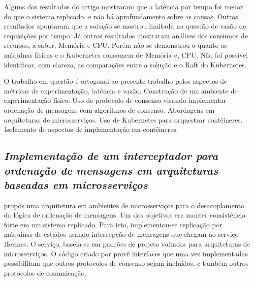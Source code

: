 
Alguns dos resultados do artigo mostraram que a latência por tempo foi menor do que o sistema replicado, e não há aprofundamento sobre as causas. Outros resultados apontaram que a solução se mostrou limitada na questão de vazão de requisições por tempo. Já outros resultados mostraram análises dos consumos de recursos, a saber, Memória e CPU. Porém não se demonstrou o quanto as máquinas físicas e o Kubernetes consomem de Memória e, CPU. Não foi possível identificar, com clareza, as comparações entre a solução e o Raft do Kubernetes.


O trabalho em questão é ortogonal ao presente trabalho pelos aspectos de métricas de experimentação, latência e vazão. Construção de um ambiente de experimentação físico. Uso de protocolo de consenso visando implementar ordenação de mensagens com algoritmos de consenso. Abordagens em arquiteturas de microsserviços. Uso de Kubernetes para orquestrar contêineres. Isolamento de aspectos de implementação em contêineres.



\pagebreak

\subsection{\textit{Implementação de um interceptador para ordenação de mensagens em arquiteturas baseadas em microsserviços}}

\textcite{renan2021hermes} propôs uma arquitetura em ambientes de microsserviços para o desacoplamento da lógica de ordenação de mensagens. Um dos objetivos era manter consistência forte em um sistema replicado. Para isto, implementou-se replicação por máquinas de estados usando intercepção de mensagens que chegam ao serviço Hermes. O serviço, baseia-se em padrões de projeto voltados para arquiteturas de microsserviços. O código criado por \textcite{renan2021hermes} provê interfaces que uma vez implementadas possibilitam que outros protocolos de consenso sejam incluídos, e também outros protocolos de comunicação.

